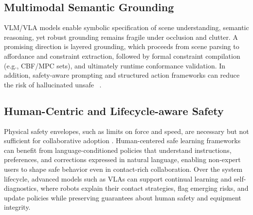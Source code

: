 \documentclass[Afour,sageh,times]{template/sagej}
\begin{document}
    \subsection{Multimodal Semantic Grounding}
    VLM/VLA models enable symbolic specification of scene understanding, semantic reasoning\citep{33,330,10705419}, yet robust grounding remains fragile under
    occlusion and clutter. A promising direction is layered grounding, which proceeds from scene parsing to affordance and constraint extraction, followed by formal constraint compilation (e.g., CBF/MPC sets), and ultimately runtime conformance validation. In addition, safety‑aware prompting and structured action frameworks can reduce the risk of hallucinated unsafe ~\cite{geminiroboticsteam2025evaluatinggeminiroboticspolicies}.

    
    \subsection{Human-Centric and Lifecycle-aware Safety}
    Physical safety envelopes, such as limits on force and speed, are necessary but not sufficient for collaborative adoption \citep{ajoudani2018progress}. Human-centered safe learning frameworks can benefit from language-conditioned policies that understand instructions, preferences, and corrections expressed in natural language, enabling non-expert users to shape safe behavior even in contact-rich collaboration. Over the system lifecycle, advanced models such as VLAs can support continual learning and self-diagnostics, where robots explain their contact strategies, flag emerging risks, and update policies while preserving guarantees about human safety and equipment integrity.
\end{document}
